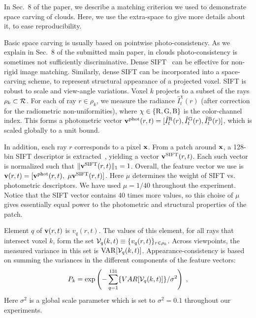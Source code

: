 \documentclass[runningheads]{llncs}
\begin{document}
In Sec.~8 of the paper, we describe a matching criterion we used to demonstrate space carving of clouds. Here, we use the extra-space to give more details about it, to ease reproducibility.

Basic space carving is usually based on pointwise photo-consistency. As we explain in Sec.~8 of the submitted main paper, in clouds photo-consistency is sometimes not sufficiently discriminative. Dense SIFT~\cite{liu2008sift} can be effective for non-rigid image matching. Similarly, dense SIFT can be incorporated into a space-carving scheme, to represent structural appearance of a projected voxel. SIFT is robust to scale and view-angle variations.
Voxel $k$ projects to a subset of the rays $\rho_k\subset{\cal R}$.
For each of ray $r\in\rho_k$, we measure the radiance $\hat I_t^{\chi}(r)$ (after correction for the radiometric non-uniformities), where
 $\chi\in\{{\rm R,G,B}\}$ is the color-channel index. This forms a photometric vector ${\bf v}^{\rm phot}(r,t)=[\hat I^{\rm R}_t(r),\hat I^{\rm G}_t(r),\hat I^{\rm B}_t(r)]$, which is scaled globally to a unit bound.

In addition, each ray $r$ corresponds to a pixel ${\bf x}$. From a %
patch around ${\bf x}$, a 128-bin SIFT descriptor is extracted~\cite{lowe1999object}, yielding a vector
${\bf v}^{\rm SIFT}(r,t)$. Each such vector is normalized such that
$\|{\bf v}^{\rm SIFT}(r,t)\|_1=1$. Overall, the feature vector we use is
${\bf v}(r,t)=[{\bf v}^{\rm phot}(r,t), ~\mu{\bf v}^{\rm SIFT}(r,t)]$. Here $\mu$ determines the weight of SIFT vs. photometric descriptors. We have used $\mu=1/40$ throughout the experiment. Notice that the SIFT vector contains 40 times more values, so this choise of $\mu$ gives essentially equal power to the photometric and structural properties of the patch.

Element $q$ of ${\bf v}(r,t)$ is $v_q(r,t)$. The values of this element, for all rays that intersect voxel $k$, form the set \mbox{${\cal V}_q(k,t)\equiv\{v_q(r,t)\}_{r\in\rho_k}$}.
Across viewpoints, the measured variance in this set is
${\rm VAR}[{\cal V}_q(k,t)]$.
Appearance-consistency is based on summing the variances in the different components of the feature vectors:
\begin{equation}
 P_k= \exp\left(
         -\sum_{q=1}^{131}\{VAR[{\cal V}_q(k,t)]\}/\sigma^2
         \right)
  \;,
 \label{eq:Dist}
\end{equation}
Here $\sigma^2$ is a global scale parameter which is set to $\sigma^2=0.1$ throughout our experiments.
\end{document}
